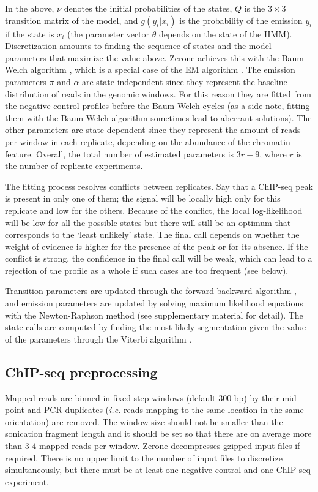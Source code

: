 \documentclass{bioinfo}
\begin{document}
\begin{methods}
In the above, $\nu$ denotes the initial probabilities of the states,
$Q$ is the $3 \times 3$ transition matrix of the model, and
$g(y_i|x_i)$ is the probability of the emission $y_i$ if the state is
$x_i$ (the parameter vector $\theta$ depends on the state of the HMM).
Discretization amounts to finding the sequence of states and the
model parameters that maximize the value above. Zerone achieves this
with the Baum-Welch algorithm \citep{baum1966}, which is a special case
of the EM algorithm \citep{Dempster77maximumlikelihood}. The emission
parameters $\pi$ and $\alpha$ are state-independent since they represent
the baseline distribution of reads in the genomic windows. For this
reason they are fitted from the negative control profiles before the
Baum-Welch cycles (as a side note, fitting them with the Baum-Welch
algorithm sometimes lead to aberrant solutions). The other parameters
are state-dependent since they represent the amount of reads per window
in each replicate, depending on the abundance of the chromatin feature.
Overall, the total number of estimated parameters is $3r+9$, where $r$
is the number of replicate experiments.

The fitting process resolves conflicts between replicates. Say that
a ChIP-seq peak is present in only one of them; the signal
will be locally high only for this replicate and low for the others.
Because of the conflict, the local log-likelihood will be low for
all the possible states but there will still be an optimum that
corresponds to the `least unlikely' state. The final call depends on
whether the weight of evidence is higher for the presence of the
peak or for its absence. If the conflict is strong, the confidence
in the final call will be weak, which can lead to a rejection of
the profile as a whole if such cases are too frequent (see below).

Transition parameters are updated through the forward-backward
algorithm \citep{18626}, and emission parameters are updated by solving
maximum likelihood equations with the Newton-Raphson method (see
supplementary material for detail). The state calls are computed by
finding the most likely segmentation given the value of the parameters
through the Viterbi algorithm \citep{1054010}.

\subsection{ChIP-seq preprocessing}
Mapped reads are binned in fixed-step windows (default 300
bp) by their mid-point and PCR duplicates (\textit{i.e.} reads mapping to
the same location in the same orientation) are removed. The window size
should not be smaller than the sonication fragment length and
it should be set so that there are on average more than 3-4 mapped reads
per window. Zerone decompresses gzipped input files if required. There is
no upper limit to the number of input files to discretize simultaneously,
but there must be at least one negative control and one ChIP-seq experiment.


\end{methods}
\end{document}
